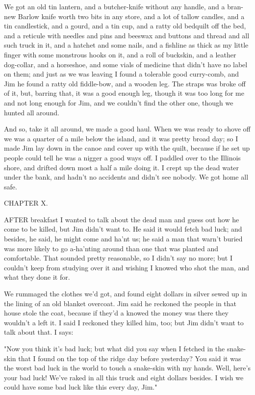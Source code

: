 We got an old tin lantern, and a butcher-knife without any handle, and a
bran-new Barlow knife worth two bits in any store, and a lot of tallow
candles, and a tin candlestick, and a gourd, and a tin cup, and a ratty
old bedquilt off the bed, and a reticule with needles and pins and
beeswax and buttons and thread and all such truck in it, and a hatchet
and some nails, and a fishline as thick as my little finger with some
monstrous hooks on it, and a roll of buckskin, and a leather dog-collar,
and a horseshoe, and some vials of medicine that didn't have no label on
them; and just as we was leaving I found a tolerable good curry-comb, and
Jim he found a ratty old fiddle-bow, and a wooden leg.  The straps was
broke off of it, but, barring that, it was a good enough leg, though it
was too long for me and not long enough for Jim, and we couldn't find the
other one, though we hunted all around.

And so, take it all around, we made a good haul.  When we was ready to
shove off we was a quarter of a mile below the island, and it was pretty
broad day; so I made Jim lay down in the canoe and cover up with the
quilt, because if he set up people could tell he was a nigger a good ways
off.  I paddled over to the Illinois shore, and drifted down most a half
a mile doing it.  I crept up the dead water under the bank, and hadn't no
accidents and didn't see nobody.  We got home all safe.




CHAPTER X.

AFTER breakfast I wanted to talk about the dead man and guess out how he
come to be killed, but Jim didn't want to.  He said it would fetch bad
luck; and besides, he said, he might come and ha'nt us; he said a man
that warn't buried was more likely to go a-ha'nting around than one that
was planted and comfortable.  That sounded pretty reasonable, so I didn't
say no more; but I couldn't keep from studying over it and wishing I
knowed who shot the man, and what they done it for.

We rummaged the clothes we'd got, and found eight dollars in silver sewed
up in the lining of an old blanket overcoat.  Jim said he reckoned the
people in that house stole the coat, because if they'd a knowed the money
was there they wouldn't a left it.  I said I reckoned they killed him,
too; but Jim didn't want to talk about that.  I says:

"Now you think it's bad luck; but what did you say when I fetched in the
snake-skin that I found on the top of the ridge day before yesterday?
You said it was the worst bad luck in the world to touch a snake-skin
with my hands.  Well, here's your bad luck!  We've raked in all this
truck and eight dollars besides.  I wish we could have some bad luck like
this every day, Jim."

